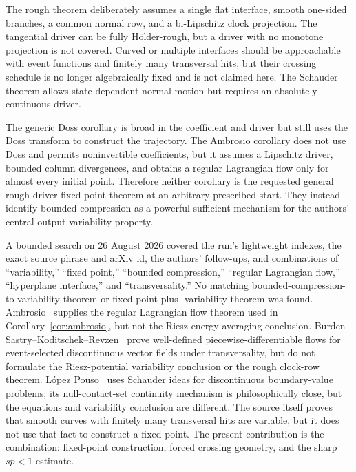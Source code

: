 \documentclass[11pt]{article}
\begin{document}
The rough theorem deliberately assumes a single flat interface, smooth
one-sided branches, a common normal row, and a bi-Lipschitz clock projection.
The tangential driver can be fully H\"older-rough, but a driver with no monotone
projection is not covered.  Curved or multiple interfaces should be approachable
with event functions and finitely many transversal hits, but their crossing
schedule is no longer algebraically fixed and is not claimed here.  The
Schauder theorem allows state-dependent normal motion but requires an
absolutely continuous driver.

The generic Doss corollary is broad in the coefficient and driver but still
uses the Doss transform to construct the trajectory.  The Ambrosio corollary
does not use Doss and permits noninvertible coefficients, but it assumes a
Lipschitz driver, bounded column divergences, and obtains a regular
Lagrangian flow only for almost every initial point.  Therefore neither
corollary is the requested general rough-driver fixed-point theorem at an
arbitrary prescribed start.  They instead identify bounded compression as a
powerful sufficient mechanism for the authors' central output-variability
property.

A bounded search on 26 August 2026 covered the run's lightweight indexes, the
exact source phrase and arXiv id, the authors' follow-ups, and combinations of
``variability,'' ``fixed point,'' ``bounded compression,'' ``regular
Lagrangian flow,'' ``hyperplane interface,'' and ``transversality.''  No
matching bounded-compression-to-variability theorem or fixed-point-plus-
variability theorem was found.  Ambrosio~\cite{Ambrosio} supplies the regular
Lagrangian flow theorem used in Corollary~\ref{cor:ambrosio}, but not the
Riesz-energy averaging conclusion.  Burden--Sastry--Koditschek--Revzen~\cite{Burden} prove well-defined
piecewise-differentiable flows for event-selected discontinuous vector fields
under transversality, but do not formulate the Riesz-potential variability
conclusion or the rough clock-row theorem.  L\'opez Pouso~\cite{Pouso} uses
Schauder ideas for discontinuous boundary-value problems; its null-contact-set
continuity mechanism is philosophically close, but the equations and
variability conclusion are different.  The source itself proves that smooth
curves with finitely many transversal hits are variable, but it does not use
that fact to construct a fixed point.  The present contribution is the
combination: fixed-point construction, forced crossing geometry, and the sharp
$sp<1$ estimate.
\end{document}
